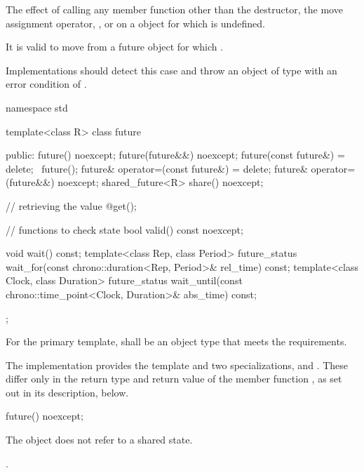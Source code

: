 \pnum
The effect of calling any member function other than the destructor, the
move assignment operator, , or  on a  object for which
is undefined.
\begin{note}
It is valid to move from a future object for which .
\end{note}

\recommended
Implementations should detect this case and throw an object of type
 with an error condition of .

%
\begin{codeblock}
namespace std {
  template<class R>
  class future {
  public:
    future() noexcept;
    future(future&&) noexcept;
    future(const future&) = delete;
    ~future();
    future& operator=(const future&) = delete;
    future& operator=(future&&) noexcept;
    shared_future<R> share() noexcept;

    // retrieving the value
    @\seebelow@ get();

    // functions to check state
    bool valid() const noexcept;

    void wait() const;
    template<class Rep, class Period>
      future_status wait_for(const chrono::duration<Rep, Period>& rel_time) const;
    template<class Clock, class Duration>
      future_status wait_until(const chrono::time_point<Clock, Duration>& abs_time) const;
  };
}
\end{codeblock}

\pnum
For the primary template,  shall be an object type that
meets the  requirements.

\pnum
The implementation provides the template  and two specializations,
 and . These differ only in the return type and return
value of the member function , as set out in its description, below.

%
\begin{itemdecl}
future() noexcept;
\end{itemdecl}

\begin{itemdescr}
\pnum
\effects
The object does not refer to a shared state.

\pnum
\ensures
{}.
\end{itemdescr}

